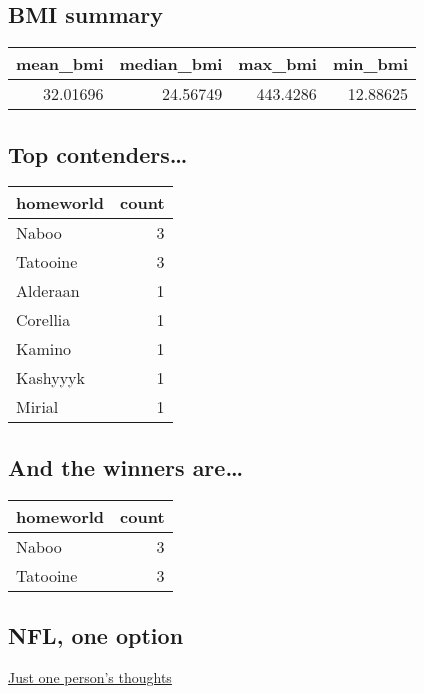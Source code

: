 \documentclass[
]{book}
\begin{document}
\hypertarget{bmi-summary-1}{%
\subsection{BMI summary}\label{bmi-summary-1}}

\begin{tabular}{r|r|r|r}
\hline
mean\_bmi & median\_bmi & max\_bmi & min\_bmi\\
\hline
32.01696 & 24.56749 & 443.4286 & 12.88625\\
\hline
\end{tabular}

\hypertarget{top-contenders}{%
\subsection{Top contenders\ldots{}}\label{top-contenders}}

\begin{tabular}{l|r}
\hline
homeworld & count\\
\hline
Naboo & 3\\
\hline
Tatooine & 3\\
\hline
Alderaan & 1\\
\hline
Corellia & 1\\
\hline
Kamino & 1\\
\hline
Kashyyyk & 1\\
\hline
Mirial & 1\\
\hline
\end{tabular}

\hypertarget{and-the-winners-are}{%
\subsection{And the winners are\ldots{}}\label{and-the-winners-are}}

\begin{tabular}{l|r}
\hline
homeworld & count\\
\hline
Naboo & 3\\
\hline
Tatooine & 3\\
\hline
\end{tabular}

\hypertarget{nfl-one-option}{%
\subsection{NFL, one option}\label{nfl-one-option}}

\href{https://rpubs.com/afuecker/727520}{Just one person's thoughts}

  
\end{document}
